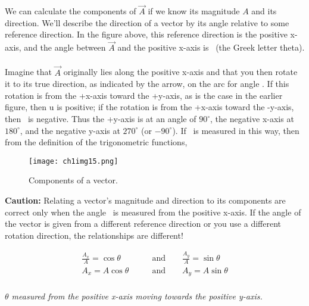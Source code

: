 We can calculate the components of $\overrightarrow{A}$  if we know its magnitude $A$ and its direction. We’ll describe the direction of a vector by its angle relative to some reference direction. In the figure above, this reference direction is the positive x-axis, and the angle between $\overrightarrow{A}$ and the positive x-axis is \theta \,  (the Greek letter theta). \\\\
Imagine that $\overrightarrow{A}$  originally lies along the positive x-axis and that you then rotate it to its true direction, as indicated by the arrow, on the arc for angle \theta. If this rotation is from the +x-axis toward the +y-axis, as is the case in the earlier figure, then u is positive; if the rotation is from the +x-axis toward the -y-axis, then \theta \, is negative. Thus the +y-axis is at an angle of $90^\circ$, the negative x-axis at $180^\circ$, and the negative y-axis at $270^\circ$ (or $-90^\circ$). If \theta \, is measured in this way, then from the definition of the trigonometric functions,

\begin{figure}[htbp]
 \centering
\texttt{[image: ch1img15.png]}
  \caption{Components of a vector.}
  \label{fig:ch1img15}
\end{figure}
\FloatBarrier

\textbf{Caution:} Relating a vector’s magnitude and direction to its components are correct only when the angle \theta\, is measured from the positive x-axis. If the angle of the vector is
given from a different reference direction or you use a different rotation direction, the relationships are different!

\begin{mathbox}
\begin{align*}
\frac{A_x}{A} = \cos \theta \qquad &\text{and} \qquad \frac{A_y}{A} = \sin \theta \\
A_x = A \cos \theta \qquad &\text{and} \qquad A_y = A \sin \theta \\
\end{align*}
\centerline{\textit{$\theta$ measured from the positive x-axis moving towards the positive y-axis.}}
\end{mathbox}

